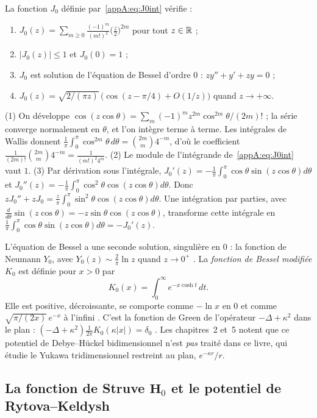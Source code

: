 \begin{proposition}[$J_0$]\label{appA:prop:J0}
La fonction $J_0$ définie par~\eqref{appA:eq:J0int} vérifie :
\begin{enumerate}
\item $J_0(z)=\sum_{m\ge0}\frac{(-1)^m}{(m!)^2}\bigl(\frac z2\bigr)^{2m}$ pour tout $z\in\mathbb{R}$ ;
\item $|J_0(z)|\le1$ et $J_0(0)=1$ ;
\item $J_0$ est solution de l'équation de Bessel d'ordre $0$ : $zy''+y'+zy=0$ ;
\item \tierL{} $J_0(z)=\sqrt{2/(\pi z)}\,\bigl(\cos(z-\pi/4)+O(1/z)\bigr)$ quand $z\to+\infty$.
\end{enumerate}
\end{proposition}

\begin{humanproof}
(1) On développe $\cos(z\cos\theta)=\sum_m(-1)^m z^{2m}\cos^{2m}\theta/(2m)!$ ; la série converge normalement en
$\theta$, et l'on intègre terme à terme. Les intégrales de Wallis donnent
$\frac1\pi\int_0^\pi\cos^{2m}\theta\,d\theta=\binom{2m}m4^{-m}$, d'où le coefficient
$\frac{1}{(2m)!}\binom{2m}{m}4^{-m}=\frac{1}{(m!)^2 4^m}$.
(2) Le module de l'intégrande de~\eqref{appA:eq:J0int} vaut $1$.
(3) Par dérivation sous l'intégrale, $J_0'(z)=-\frac1\pi\int_0^\pi\cos\theta\sin(z\cos\theta)d\theta$ et
$J_0''(z)=-\frac1\pi\int_0^\pi\cos^2\theta\cos(z\cos\theta)d\theta$. Donc
$zJ_0''+zJ_0=\frac z\pi\int_0^\pi\sin^2\theta\cos(z\cos\theta)d\theta$. Une intégration par parties, avec
$\frac{d}{d\theta}\sin(z\cos\theta)=-z\sin\theta\cos(z\cos\theta)$, transforme cette intégrale en
$\frac1\pi\int_0^\pi\cos\theta\sin(z\cos\theta)d\theta=-J_0'(z)$.
\end{humanproof}

L'équation de Bessel a une seconde solution, singulière en $0$ : la fonction de Neumann $Y_0$, avec
$Y_0(z)\sim\frac2\pi\ln z$ quand $z\to0^+$ \tierL. La \emph{fonction de Bessel modifiée} $K_0$ est définie pour $x>0$ par
\[K_0(x)=\int_0^\infty e^{-x\cosh t}\,dt .\]
Elle est positive, décroissante, se comporte comme $-\ln x$ en $0$ et comme $\sqrt{\pi/(2x)}\,e^{-x}$ à l'infini \tierL.
C'est la fonction de Green de l'opérateur $-\Delta+\kappa^2$ dans le plan : $(-\Delta+\kappa^2)\frac1{2\pi}K_0(\kappa|x|)=\delta_0$
\tierL. Les chapitres~2 et~5 notent que ce potentiel de Debye--Hückel bidimensionnel n'est \emph{pas} traité dans
ce livre, qui étudie le Yukawa tridimensionnel restreint au plan, $e^{-\kappa r}/r$.

\subsection{La fonction de Struve \texorpdfstring{$\mathbf H_0$}{H0} et le potentiel de Rytova--Keldysh}

